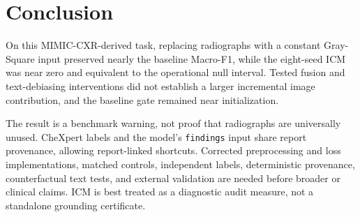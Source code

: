 
\section{Conclusion}\label{sec:conclusion}

On this MIMIC-CXR-derived task, replacing radiographs with a constant
Gray-Square input preserved nearly the baseline Macro-F1, while the eight-seed
ICM was near zero and equivalent to the operational null interval. Tested
fusion and text-debiasing interventions did not establish a larger incremental
image contribution, and the baseline gate remained near initialization.

The result is a benchmark warning, not proof that radiographs are universally
unused. CheXpert labels and the model’s \texttt{findings} input share report
provenance, allowing report-linked shortcuts. Corrected preprocessing and loss
implementations, matched controls, independent labels, deterministic
provenance, counterfactual text tests, and external validation are needed before
broader or clinical claims. ICM is best treated as a diagnostic audit measure,
not a standalone grounding certificate.
